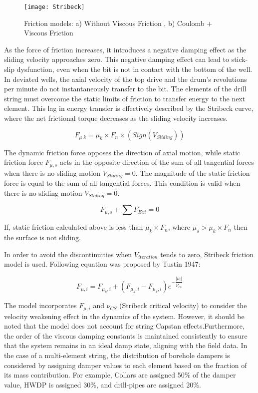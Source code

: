 \begin{figure}
  \centering
  \texttt{[image: Stribeck]}
  \caption{Friction models: a) Without Viscous Friction , b) Coulomb + Viscous Friction}\label{Friction models}
\end{figure}

As the force of friction increases, it introduces a negative damping effect as the sliding velocity approaches zero. This negative damping effect can lead to stick-slip dysfunction, even when the bit is not in contact with the bottom of the well. In deviated wells, the axial velocity of the top drive and the drum's revolutions per minute do not instantaneously transfer to the bit. The elements of the drill string must overcome the static limits of friction to transfer energy to the next element. This lag in energy transfer is effectively described by the Stribeck curve, where the net frictional torque decreases as the sliding velocity increases.

\begin{equation}\label{dyanmic_force}
  F_{\mu\; k} = \mu_{k}\times F_{n} \times (Sign(V_{Sliding}))
\end{equation}

The dynamic friction force opposes the direction of axial motion, while static friction force $F_{\mu,s}$ acts in the opposite direction of the sum of all tangential forces when there is no sliding motion $V_{Sliding}=0$. The magnitude of the static friction force is equal to the sum of all tangential forces. This condition is valid when there is no sliding motion $V_{Sliding}=0$.

\begin{equation}\label{zero}
  F_{\mu,s} + \sum F_{Ext} = 0
\end{equation}

If, static friction calculated above is less than $\mu_{k}\times F_{n}$, where $\mu_{s} > \mu_{k}\times F_{n}$ then the surface is not sliding.

In order to avoid the discontinuities when $V_{iteration}$ tends to zero, Stribeck friction model is used. Following equation was proposed by Tustin 1947:

\begin{equation}\label{Stribeck velocity}
  F_{\mu,i} = F_{\mu_{k},i} + (F_{\mu_{s},i} - F_{\mu_{k},i})e^{-\dfrac{|\nu_{i}|}{\nu_{cs}}}
\end{equation} 

The model incorporates $F_{\mu,i}$ and $\nu_{CS}$ (Stribeck critical velocity) to consider the velocity weakening effect in the dynamics of the system. However, it should be noted that the model does not account for string Capstan effects.Furthermore, the order of the viscous damping constants is maintained consistently to ensure that the system remains in an ideal damp state, aligning with the field data. In the case of a multi-element string, the distribution of borehole dampers is considered by assigning damper values to each element based on the fraction of its mass contribution. For example, Collars are assigned 50\% of the damper value, HWDP is assigned 30\%, and drill-pipes are assigned 20\%. 

